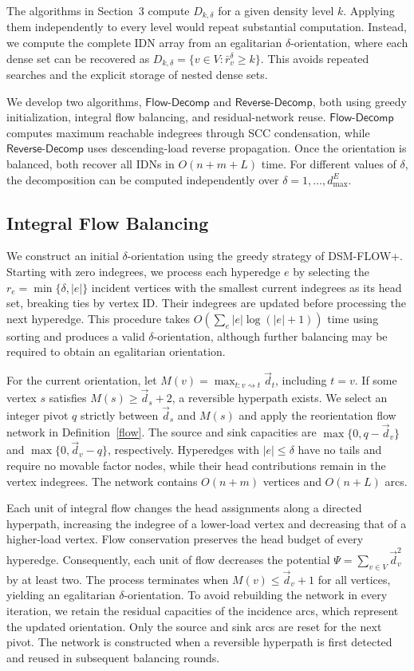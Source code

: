 \documentclass[twocolumn]{svjour3}
\newcommand{\kw}[1]{{\ensuremath{\mathsf{#1}}}\xspace}
\begin{document}
The algorithms in Section~3 compute $D_{k,\delta}$ for a given density level $k$. Applying them independently to every level would repeat substantial computation. Instead, we compute the complete IDN array from an egalitarian $\delta$-orientation, where each dense set can be recovered as $D_{k,\delta}=\{v\in V:\bar r_v^\delta\ge k\}$. This avoids repeated searches and the explicit storage of nested dense sets.

We develop two algorithms, \kw{Flow\text{-}Decomp} and \kw{Reverse\text{-}Decomp}, both using greedy initialization, integral flow balancing, and residual-network reuse. \kw{Flow\text{-}Decomp} computes maximum reachable indegrees through SCC condensation, while \kw{Reverse\text{-}Decomp} uses descending-load reverse propagation. Once the orientation is balanced, both recover all IDNs in $O(n+m+L)$ time. For different values of $\delta$, the decomposition can be computed independently over $\delta=1,\ldots,d^E_{\max}$.

\subsection{Integral Flow Balancing}
\label{subsec:reusable-flow}
We construct an initial $\delta$-orientation using the greedy strategy of DSM-FLOW+. Starting with zero indegrees, we process each hyperedge $e$ by selecting the $r_e=\min\{\delta,|e|\}$ incident vertices with the smallest current indegrees as its head set, breaking ties by vertex ID. Their indegrees are updated before processing the next hyperedge. This procedure takes $O(\sum_e |e|\log(|e|+1))$ time using sorting and produces a valid $\delta$-orientation, although further balancing may be required to obtain an egalitarian orientation.

For the current orientation, let $M(v)=\max_{t:v\rightsquigarrow t}\vec d_t$, including $t=v$. If some vertex $s$ satisfies $M(s)\ge\vec d_s+2$, a reversible hyperpath exists. We select an integer pivot $q$ strictly between $\vec d_s$ and $M(s)$ and apply the reorientation flow network in Definition~\ref{flow}. The source and sink capacities are $\max\{0,q-\vec d_v\}$ and $\max\{0,\vec d_v-q\}$, respectively. Hyperedges with $|e|\le\delta$ have no tails and require no movable factor nodes, while their head contributions remain in the vertex indegrees. The network contains $O(n+m)$ vertices and $O(n+L)$ arcs.

Each unit of integral flow changes the head assignments along a directed hyperpath, increasing the indegree of a lower-load vertex and decreasing that of a higher-load vertex. Flow conservation preserves the head budget of every hyperedge. Consequently, each unit of flow decreases the potential $\Psi=\sum_{v\in V}\vec d_v^2$ by at least two. The process terminates when $M(v)\le\vec d_v+1$ for all vertices, yielding an egalitarian $\delta$-orientation.
To avoid rebuilding the network in every iteration, we retain the residual capacities of the incidence arcs, which represent the updated orientation. Only the source and sink arcs are reset for the next pivot. The network is constructed when a reversible hyperpath is first detected and reused in subsequent balancing rounds.
\end{document}
